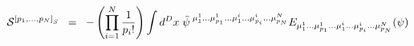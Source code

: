 \begin{equation}
{\cal{S}}^{{[ p_1 ,..., p_N ]}_S} \;\; =\;\; - \left( \prod_{i=1}^{N}
\frac{1}{p_i !} \right) \int d^D x \; {\bar{\psi}}^{\; {\mu}^1_1
...{\mu}^1_{p_1} ...{\mu}^i_1 ...{\mu}^i_{p_i} ...{\mu}^N_{p_N} }
E_{{\mu}^1_1 ...{\mu}^1_{p_1} ...{\mu}^i_1 ...{\mu}^i_{p_i}
...{\mu}^N_{p_N}} ( \psi )
\label{eq:3.5}
\end{equation}

